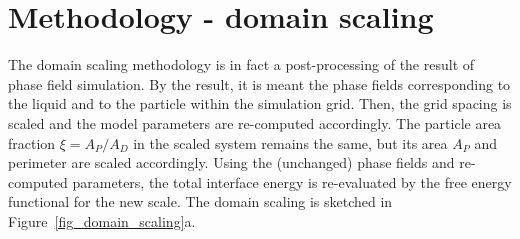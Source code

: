 \section{Methodology - domain scaling}
The domain scaling methodology is in fact a post-processing of the result of phase field simulation. By the result, it is meant the phase fields corresponding to the liquid and to the particle within the simulation grid. Then, the grid spacing is scaled and the model parameters are re-computed accordingly. The particle area fraction $\xi=A_P/A_D$ in the scaled system remains the same, but its area $A_P$ and perimeter are scaled accordingly. Using the (unchanged) phase fields and re-computed parameters, the total interface energy is re-evaluated by the free energy functional for the new scale. The domain scaling is sketched in Figure~\ref{fig_domain_scaling}a. 

